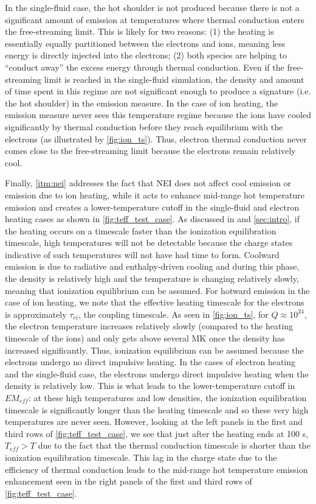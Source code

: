 \documentclass[apj]{emulateapj}
\begin{document}
	\par In the single-fluid case, the hot shoulder is not produced because there is not a significant amount of emission at temperatures where thermal conduction enters the free-streaming limit. This is likely for two reasons: (1) the heating is essentially equally partitioned between the electrons and ions, meaning less energy is directly injected into the electrons; (2) both species are helping to ``conduct away'' the excess energy through thermal conduction. Even if the free-streaming limit is reached in the single-fluid simulation, the density and amount of time spent in this regime are not significant enough to produce a signature (i.e. the hot shoulder) in the emission measure. In the case of ion heating, the emission measure never sees this temperature regime because the ions have cooled significantly by thermal conduction before they reach equilibrium with the electrons (as illustrated by \autoref{fig:ion_ts}). Thus, electron thermal conduction never comes close to the free-streaming limit because the electrons remain relatively cool.
	\par Finally, \autoref{itm:nei} addresses the fact that NEI does not affect cool emission or emission due to ion heating, while it acts to enhance mid-range hot temperature emission and creates a lower-temperature cutoff in the single-fluid and electron heating cases as shown in \autoref{fig:teff_test_case}. As discussed in  and \autoref{sec:intro}, if the heating occurs on a timescale faster than the ionization equilibration timescale, high temperatures will not be detectable because the charge states indicative of such temperatures will not have had time to form. Coolward emission is due to radiative and enthalpy-driven cooling and during this phase, the density is relatively high and the temperature is changing relatively slowly, meaning that ionization equilibrium can be assumed. 
	For hotward emission in the case of ion heating, we note that the effective heating timescale for the electrons is approximately $\tau_{ei}$, the coupling timescale. As seen in \autoref{fig:ion_ts}, for $Q\approx10^{24}$, the electron temperature increases relatively slowly (compared to the heating timescale of the ions) and only gets above several MK once the density has increased significantly. Thus, ionization equilibrium can be assumed because the electrons undergo no direct impulsive heating. In the cases of electron heating and the single-fluid case, the electrons undergo direct impulsive heating when the density is relatively low. This is what leads to the lower-temperature cutoff in $EM_{eff}$: at these high temperatures and low densities, the ionization equilibration timescale is significantly longer than the heating timescale and so these very high temperatures are never seen. However, looking at the left panels in the first and third rows of \autoref{fig:teff_test_case}, we see that just after the heating ends at 100 s, $T_{eff}>T$ due to the fact that the thermal conduction timescale is shorter than the ionization equilibration timescale. This lag in the charge state due to the efficiency of thermal conduction leads to the mid-range hot temperature emission enhancement seen in the right panels of the first and third rows of \autoref{fig:teff_test_case}. 
\end{document}
